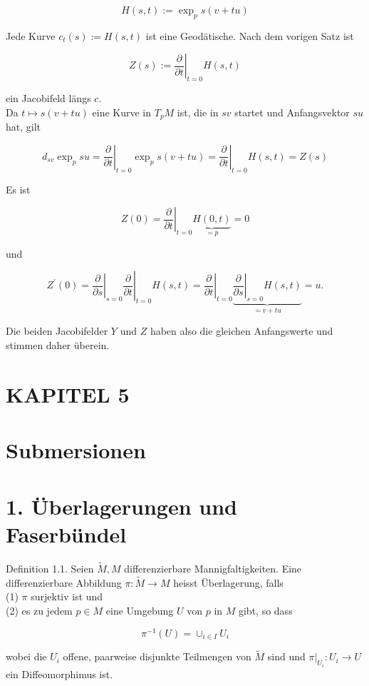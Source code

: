 \documentclass[10pt, letterpaper]{article}
\begin{document}
$$
H(s, t):=\exp _{p} s(v+t u)
$$

Jede Kurve $c_{t}(s):=H(s, t)$ ist eine Geodätische. Nach dem vorigen Satz ist

$$
Z(s):=\left.\frac{\partial}{\partial t}\right|_{t=0} H(s, t)
$$

ein Jacobifeld längs $c$.\\
Da $t \mapsto s(v+t u)$ eine Kurve in $T_{p} M$ ist, die in $s v$ startet und Anfangsvektor $s u$ hat, gilt

$$
d_{s v} \exp _{p} s u=\left.\frac{\partial}{\partial t}\right|_{t=0} \exp _{p} s(v+t u)=\left.\frac{\partial}{\partial t}\right|_{t=0} H(s, t)=Z(s)
$$

Es ist

$$
Z(0)=\left.\frac{\partial}{\partial t}\right|_{t=0} \underbrace{H(0, t)}_{=p}=0
$$

und

$$
Z^{\prime}(0)=\left.\left.\frac{\partial}{\partial s}\right|_{s=0} \frac{\partial}{\partial t}\right|_{t=0} H(s, t)=\left.\frac{\partial}{\partial t}\right|_{t=0} \underbrace{\left.\frac{\partial}{\partial s}\right|_{s=0} H(s, t)}_{=v+t u}=u .
$$

Die beiden Jacobifelder $Y$ und $Z$ haben also die gleichen Anfangswerte und stimmen daher überein.

\section*{KAPITEL 5}
\section*{Submersionen}
\section*{1. Überlagerungen und Faserbündel}
Definition 1.1. Seien $\tilde{M}, M$ differenzierbare Mannigfaltigkeiten. Eine differenzierbare Abbildung $\pi: \tilde{M} \rightarrow M$ heisst Überlagerung, falls\\
(1) $\pi$ surjektiv ist und\\
(2) es zu jedem $p \in M$ eine Umgebung $U$ von $p$ in $M$ gibt, so dass

$$
\pi^{-1}(U)=\cup_{i \in I} U_{i}
$$

wobei die $U_{i}$ offene, paarweise disjunkte Teilmengen von $\tilde{M}$ sind und $\left.\pi\right|_{U_{i}}: U_{i} \rightarrow U$ ein Diffeomorphimus ist.
\end{document}
